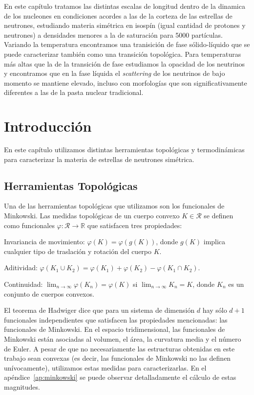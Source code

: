 En este capítulo tratamos las distintas escalas de longitud dentro de la dinamica de los nucleones en condiciones acordes a las de la corteza de las estrellas de neutrones, estudiando materia simétrica en isospín (igual cantidad de protones y neutrones) a densidades menores a la de saturación para 5000 partículas.
Variando la temperatura encontramos una tranisición de fase sólido-líquido que se puede caracterizar también como una transición topológica.
Para temperaturas más altas que la de la transición de fase estudiamos la opacidad de los neutrinos y encontramos que en la fase líquida el \emph{scattering} de los neutrinos de bajo momento se mantiene elevado, incluso con morfologías que son significativamente diferentes a las de la pasta nuclear tradicional.


\section{Introducción}

En este capítulo utilizamos distintas herramientas topológicas y termodinámicas para caracterizar la materia de estrellas de neutrones simétrica.

\subsection{Herramientas Topológicas}

Una de las herramientas topológicas que utilizamos son los funcionales de Minkowski.
Las medidas topológicas de un cuerpo convexo $K \in \mathcal{R}$ se definen como funcionales $\varphi: \mathcal{R} \rightarrow \mathbb{R}$ que satisfacen tres propiedades:

\begin{description}
  \item{Invariancia de movimiento:} $\varphi(K) = \varphi(g(K))$, donde $g(K)$ implica cualquier tipo de traslación y rotación del cuerpo $K$.
  \item{Aditividad:} $\varphi(K_1 \cup K_2) = \varphi(K_1) + \varphi(K_2) - \varphi(K_1 \cap K_2)$.
  \item{Continuidad:} $\lim_{n\rightarrow\infty}\varphi(K_n) = \varphi(K)$ si $\lim_{n\rightarrow\infty}K_n = K$, donde ${K_n}$ es un conjunto de cuerpos convexos.
\end{description}

El teorema de Hadwiger dice que para un sistema de dimensión $d$ hay sólo $d+1$ funcionales independientes que satisfacen las propiedades mencionadas: las funcionales de Minkowski. En el espacio tridimensional, las funcionales de Minkowski están asociadas al volumen, el área, la curvatura media y el número de Euler. A pesar de que no necesariamente las estructuras obtenidas en este trabajo sean convexas (es decir, las funcionales de Minkowski no las definen unívocamente), utilizamos estas medidas para caracterizarlas. En el apéndice~\ref{ap:minkowski} se puede observar detalladamente el cálculo de estas magnitudes.

